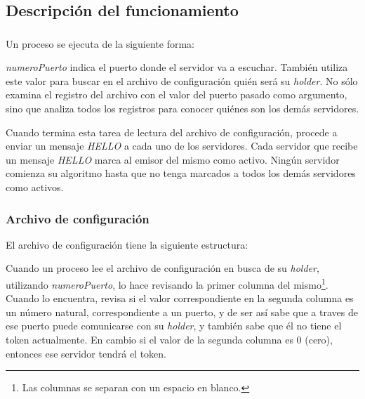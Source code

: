 \subsection{Descripción del funcionamiento}

\subsubsection{}

Un proceso  se ejecuta de la siguiente forma:


\emph{numeroPuerto} indica el puerto donde el servidor va a escuchar. También
utiliza este valor para buscar en el archivo de configuración
 quién será su \emph{holder}. No sólo examina el
registro del archivo con el valor del puerto pasado como argumento, sino que
analiza todos los registros para conocer quiénes son los demás servidores.

Cuando termina esta tarea de lectura del archivo de configuración, procede a
enviar un mensaje \emph{HELLO} a cada uno de los servidores. Cada servidor que
recibe un mensaje \emph{HELLO} marca al emisor del mismo como activo. Ningún
servidor comienza su algoritmo hasta que no tenga marcados a todos los demás
servidores como activos.


\subsubsection{Archivo de configuración }

El archivo de configuración tiene la siguiente estructura:



Cuando un proceso  lee el archivo de configuración en busca de
su \emph{holder}, utilizando \emph{numeroPuerto}, lo hace revisando la primer
columna del mismo\footnote{Las columnas se separan con un espacio en blanco.}.
Cuando lo encuentra, revisa si el valor correspondiente en la segunda columna
es un número natural, correspondiente a un puerto, y de ser así sabe que a
traves de ese puerto puede comunicarse con su \emph{holder}, y también sabe que
él no tiene el token actualmente. En cambio si el valor de la segunda columna es
0 (cero), entonces ese servidor tendrá el token.


